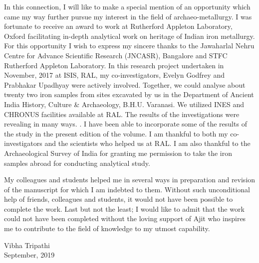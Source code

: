 In this connection, I will like to make a special mention of an opportunity which came my way further pursue my interest in the field of archaeo-metallurgy. I was fortunate to receive an award to work at Rutherford Appleton Laboratory, Oxford facilitating in-depth analytical work on heritage of Indian iron metallurgy. For this opportunity I wish to express my sincere thanks to the Jawaharlal Nehru Centre for Advance Scientific Research   (JNCASR), Bangalore and   STFC Rutherford Appleton Laboratory.  In this research project undertaken in November, 2017 at ISIS, RAL, my co-investigators, Evelyn Godfrey and Prabhakar Upadhyay were actively involved. Together, we could analyse about twenty two iron samples from sites excavated by us in the Department of Ancient India History, Culture \& Archaeology, B.H.U. Varanasi. We utilized INES and CHRONUS facilities available at RAL. The results of the investigations were revealing in many ways. . I have been able to incorporate some of the results of the study in the present edition of the volume. I am thankful to both my co-investigators and the scientists who helped us at RAL. I am also thankful to the Archaeological Survey of India for granting me permission to take the iron samples abroad for conducting analytical study. 

My colleagues and students helped me in several ways in preparation and revision of the manuscript for which I am indebted to them. Without such unconditional help of friends, colleagues and students, it would not have been possible to complete the work. Last but not the least; I would like to admit that the work could not have been completed without the loving support of Ajit who inspires me to contribute to the field of knowledge to my utmost capability. 

Vibha Tripathi\\ September, 2019
